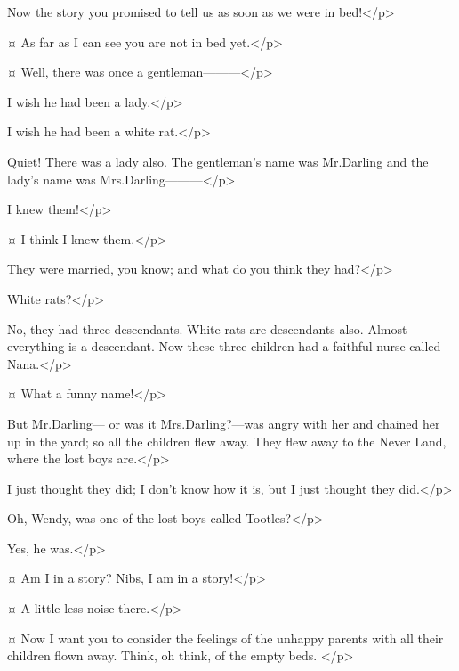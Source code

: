 \begin{drama}
\nibsspeaks
Now the story you promised to tell us as soon as we were in bed!</p>

\wendyspeaks {}¤
As far as I can see you are not in bed yet.</p>


\wendyspeaks {}¤
Well, there was once a gentleman———</p>

\curlyspeaks
I wish he had been a lady.</p>

\nibsspeaks
I wish he had been a white rat.</p>

\wendyspeaks
Quiet!
There was a lady also.
The gentleman's name was Mr.\@ Darling and the lady's name was Mrs.\@ Darling———</p>

\johnspeaks
I knew them!</p>

\michaelspeaks {}¤
I think I knew them.</p>

\wendyspeaks
They were married, you know; and what do you think they had?</p>

\nibsspeaks
White rats?</p>

\wendyspeaks
No, they had three descendants.
White rats are descendants also.
Almost everything is a descendant.
Now these three children had a faithful nurse called Nana.</p>

\michaelspeaks {}¤
What a funny name!</p>

\wendyspeaks
But Mr.\@ Darling— or was it Mrs.\@ Darling?—was angry with her
and chained her up in the yard;
so all the children flew away.
They flew away to the Never Land, where the lost boys are.</p>

\curlyspeaks
I just thought they did;
I don't know how it is, but I just thought they did.</p>

\tootlesspeaks
Oh, Wendy, was one of the lost boys called Tootles?</p>

\wendyspeaks
Yes, he was.</p>

\tootlesspeaks {}¤
Am I in a story?
Nibs, I am in a story!</p>

\peterspeaks {}¤
A little less noise there.</p>

\wendyspeaks {}¤
Now I want you to consider the feelings of the unhappy parents with all their children flown away.
Think, oh think, of the empty beds.
</p>


\end{drama}
